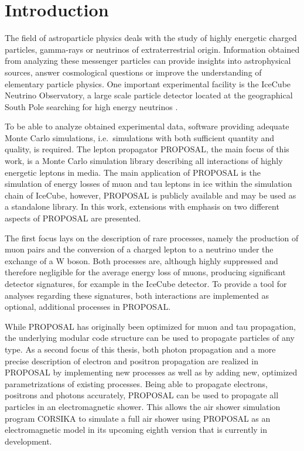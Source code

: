 \chapter{Introduction}

The field of astroparticle physics deals with the study of highly energetic charged particles, gamma-rays or neutrinos of extraterrestrial origin.
Information obtained from analyzing these messenger particles can provide insights into astrophysical sources, answer cosmological questions or improve the understanding of elementary particle physics.
One important experimental facility is the IceCube Neutrino Observatory, a large scale particle detector located at the geographical South Pole searching for high energy neutrinos \cite{Aartsen_2017}.

To be able to analyze obtained experimental data, software providing adequate Monte Carlo simulations, i.e.\ simulations with both sufficient quantity and quality, is required. 
The lepton propagator PROPOSAL, the main focus of this work, is a Monte Carlo simulation library describing all interactions of highly energetic leptons in media.
The main application of PROPOSAL is the simulation of energy losses of muon and tau leptons in ice within the simulation chain of IceCube, however, PROPOSAL is publicly available and may be used as a standalone library.
In this work, extensions with emphasis on two different aspects of PROPOSAL are presented.

The first focus lays on the description of rare processes, namely the production of muon pairs and the conversion of a charged lepton to a neutrino under the exchange of a W boson.
Both processes are, although highly suppressed and therefore negligible for the average energy loss of muons, producing significant detector signatures, for example in the IceCube detector.
To provide a tool for analyses regarding these signatures, both interactions are implemented as optional, additional processes in PROPOSAL.

While PROPOSAL has originally been optimized for muon and tau propagation, the underlying modular code structure can be used to propagate particles of any type.
As a second focus of this thesis, both photon propagation and a more precise description of electron and positron propagation are realized in PROPOSAL by implementing new processes as well as by adding new, optimized parametrizations of existing processes.
Being able to propagate electrons, positrons and photons accurately, PROPOSAL can be used to propagate all particles in an electromagnetic shower.
This allows the air shower simulation program CORSIKA to simulate a full air shower using PROPOSAL as an electromagnetic model in its upcoming eighth version that is currently in development.

